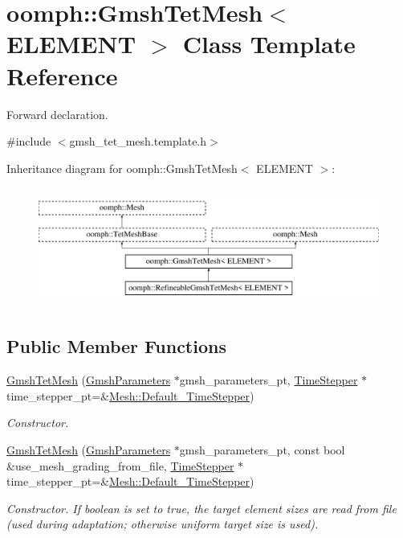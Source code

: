 \hypertarget{classoomph_1_1GmshTetMesh}{}\section{oomph\+:\+:Gmsh\+Tet\+Mesh$<$ E\+L\+E\+M\+E\+NT $>$ Class Template Reference}
\label{classoomph_1_1GmshTetMesh}


Forward declaration.  




{\ttfamily \#include $<$gmsh\+\_\+tet\+\_\+mesh.\+template.\+h$>$}

Inheritance diagram for oomph\+:\+:Gmsh\+Tet\+Mesh$<$ E\+L\+E\+M\+E\+NT $>$\+:\begin{figure}[H]
\begin{center}
\leavevmode
\includegraphics[height=3.943662cm]{classoomph_1_1GmshTetMesh}
\end{center}
\end{figure}
\subsection*{Public Member Functions}
\begin{DoxyCompactItemize}
\item 
\hyperlink{classoomph_1_1GmshTetMesh_a3f9c7d2c2a617f4b497778ff44109dbc}{Gmsh\+Tet\+Mesh} (\hyperlink{classoomph_1_1GmshParameters}{Gmsh\+Parameters} $\ast$gmsh\+\_\+parameters\+\_\+pt, \hyperlink{classoomph_1_1TimeStepper}{Time\+Stepper} $\ast$time\+\_\+stepper\+\_\+pt=\&\hyperlink{classoomph_1_1Mesh_a12243d0fee2b1fcee729ee5a4777ea10}{Mesh\+::\+Default\+\_\+\+Time\+Stepper})
\begin{DoxyCompactList}\small\item\em Constructor. \end{DoxyCompactList}\item 
\hyperlink{classoomph_1_1GmshTetMesh_a8b93f46d9a6a442f6d5e9b8e86f33882}{Gmsh\+Tet\+Mesh} (\hyperlink{classoomph_1_1GmshParameters}{Gmsh\+Parameters} $\ast$gmsh\+\_\+parameters\+\_\+pt, const bool \&use\+\_\+mesh\+\_\+grading\+\_\+from\+\_\+file, \hyperlink{classoomph_1_1TimeStepper}{Time\+Stepper} $\ast$time\+\_\+stepper\+\_\+pt=\&\hyperlink{classoomph_1_1Mesh_a12243d0fee2b1fcee729ee5a4777ea10}{Mesh\+::\+Default\+\_\+\+Time\+Stepper})
\begin{DoxyCompactList}\small\item\em Constructor. If boolean is set to true, the target element sizes are read from file (used during adaptation; otherwise uniform target size is used). \end{DoxyCompactList}\end{DoxyCompactItemize}
